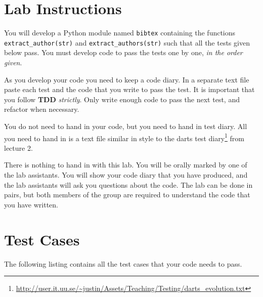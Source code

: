 \documentclass[10pt]{paper}
\begin{document}
\section*{Lab Instructions}
You will develop a Python module named \texttt{bibtex} containing the
functions \texttt{extract\_author(str)} and
\texttt{extract\_authors(str)} such that all the tests given below
pass.  You must develop code to pass the tests one by one, \emph{in
  the order given}.

As you develop your code you need to keep a code diary. In a separate
text file paste each test and the code that you write to pass the
test. It is important that you follow \textbf{TDD}
\emph{strictly}. Only write enough code to pass the next test, and
refactor when necessary.

You do not need to hand in your code, but you need to hand in test
diary. All you need to hand in is a text file similar in style to the
darts test
diary\footnote{\url{http://user.it.uu.se/~justin/Assets/Teaching/Testing/darts_evolution.txt}}
from lecture 2.

There is nothing to hand in with this lab. You will be orally marked
by one of the lab assistants. You will show your code diary that you 
have produced,
and the lab assistants will ask you questions about the code. The lab
can be done in pairs, but both members of the group are required to
understand the code that you have written.  



\section*{Test Cases}
The following listing contains all the test cases that your code needs
to pass. %
\end{document}
